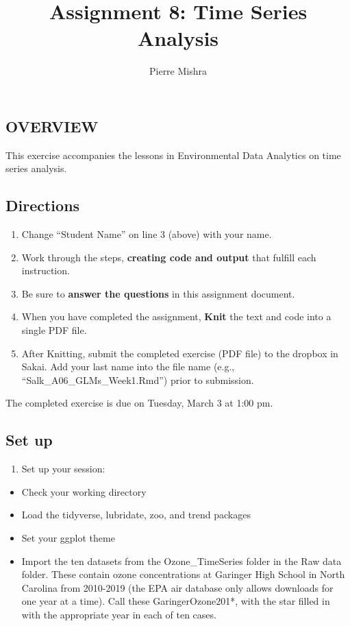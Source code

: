 \documentclass[
]{article}
\title{Assignment 8: Time Series Analysis}
\author{Pierre Mishra}
\date{}
\providecommand{\tightlist}{%
  \setlength{\itemsep}{0pt}\setlength{\parskip}{0pt}}
\begin{document}
\maketitle

\hypertarget{overview}{%
\subsection{OVERVIEW}\label{overview}}

This exercise accompanies the lessons in Environmental Data Analytics on
time series analysis.

\hypertarget{directions}{%
\subsection{Directions}\label{directions}}

\begin{enumerate}
\def\labelenumi{\arabic{enumi}.}
\tightlist
\item
  Change ``Student Name'' on line 3 (above) with your name.
\item
  Work through the steps, \textbf{creating code and output} that fulfill
  each instruction.
\item
  Be sure to \textbf{answer the questions} in this assignment document.
\item
  When you have completed the assignment, \textbf{Knit} the text and
  code into a single PDF file.
\item
  After Knitting, submit the completed exercise (PDF file) to the
  dropbox in Sakai. Add your last name into the file name (e.g.,
  ``Salk\_A06\_GLMs\_Week1.Rmd'') prior to submission.
\end{enumerate}

The completed exercise is due on Tuesday, March 3 at 1:00 pm.

\hypertarget{set-up}{%
\subsection{Set up}\label{set-up}}

\begin{enumerate}
\def\labelenumi{\arabic{enumi}.}
\tightlist
\item
  Set up your session:
\end{enumerate}

\begin{itemize}
\tightlist
\item
  Check your working directory
\item
  Load the tidyverse, lubridate, zoo, and trend packages
\item
  Set your ggplot theme
\item
  Import the ten datasets from the Ozone\_TimeSeries folder in the Raw
  data folder. These contain ozone concentrations at Garinger High
  School in North Carolina from 2010-2019 (the EPA air database only
  allows downloads for one year at a time). Call these
  GaringerOzone201*, with the star filled in with the appropriate year
  in each of ten cases.
\end{itemize}
\end{document}

